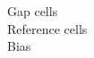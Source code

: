 \documentclass[preview]{standalone}
\begin{document}
Gap cells\\Reference cells\\Bias\\
\end{document}
